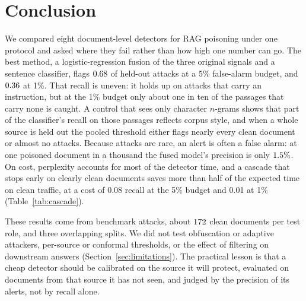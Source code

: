 \section{Conclusion}
We compared eight document-level detectors for RAG poisoning under one protocol
and asked where they fail rather than how high one number can go. The best method,
a logistic-regression fusion of the three original signals and a sentence
classifier, flags $0.68$ of held-out attacks at a 5\% false-alarm
budget, and $0.36$ at 1\%.
That recall is uneven: it holds up on attacks that carry an instruction, but at the
1\% budget only about one in ten of the passages that carry none is caught. A control
that sees only character $n$-grams shows that part of the classifier's recall on
those passages reflects corpus style, and when a whole source is held out the pooled
threshold either flags nearly every clean document or almost no attacks. Because
attacks are rare, an alert is often a false alarm: at one poisoned document in a
thousand the fused model's precision is only $1.5\%$.
On cost, perplexity accounts for most of the detector time, and a cascade that
stops early on clearly clean documents saves more than half of the expected time on
clean traffic, at a cost of 0.08 recall at the 5\% budget and 0.01 at 1\%
(Table~\ref{tab:cascade}).

These results come from benchmark attacks, about $172$ clean documents per
test role, and three overlapping splits. We did not test obfuscation or adaptive
attackers, per-source or conformal thresholds, or the effect of filtering on
downstream answers (Section~\ref{sec:limitations}). The practical lesson is that a
cheap detector should be calibrated on the source it will protect, evaluated on
documents from that source it has not seen, and judged by the precision of its
alerts, not by recall alone.